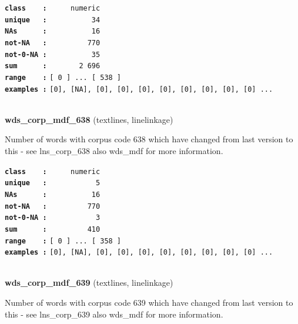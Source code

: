 \documentclass[]{article}
\begin{document}
\textbf{\texttt{class\ \ \ \ :}} \texttt{~~~~~numeric}\\
\textbf{\texttt{unique\ \ \ :}} \texttt{~~~~~~~~~~34}\\
\textbf{\texttt{NAs\ \ \ \ \ \ :}} \texttt{~~~~~~~~~~16}\\
\textbf{\texttt{not-NA\ \ \ :}} \texttt{~~~~~~~~~770}\\
\textbf{\texttt{not-0-NA\ :}} \texttt{~~~~~~~~~~35}\\
\textbf{\texttt{sum\ \ \ \ \ \ :}} \texttt{~~~~~~~2~696}\\
\textbf{\texttt{range\ \ \ \ :}}
\texttt{{[}\ 0\ {]}\ ...\ {[}\ 538\ {]}}\\
\textbf{\texttt{examples\ :}}
\texttt{{[}0{]},\ {[}NA{]},\ {[}0{]},\ {[}0{]},\ {[}0{]},\ {[}0{]},\ {[}0{]},\ {[}0{]},\ {[}0{]},\ {[}0{]}\ ...}\\

~

\textbf{wds\_corp\_mdf\_638} (textlines, linelinkage)

Number of words with corpus code 638 which have changed from last
version to this - see lns\_corp\_638 also wds\_mdf for more information.

\textbf{\texttt{class\ \ \ \ :}} \texttt{~~~~~numeric}\\
\textbf{\texttt{unique\ \ \ :}} \texttt{~~~~~~~~~~~5}\\
\textbf{\texttt{NAs\ \ \ \ \ \ :}} \texttt{~~~~~~~~~~16}\\
\textbf{\texttt{not-NA\ \ \ :}} \texttt{~~~~~~~~~770}\\
\textbf{\texttt{not-0-NA\ :}} \texttt{~~~~~~~~~~~3}\\
\textbf{\texttt{sum\ \ \ \ \ \ :}} \texttt{~~~~~~~~~410}\\
\textbf{\texttt{range\ \ \ \ :}}
\texttt{{[}\ 0\ {]}\ ...\ {[}\ 358\ {]}}\\
\textbf{\texttt{examples\ :}}
\texttt{{[}0{]},\ {[}NA{]},\ {[}0{]},\ {[}0{]},\ {[}0{]},\ {[}0{]},\ {[}0{]},\ {[}0{]},\ {[}0{]},\ {[}0{]}\ ...}\\

~

\textbf{wds\_corp\_mdf\_639} (textlines, linelinkage)

Number of words with corpus code 639 which have changed from last
version to this - see lns\_corp\_639 also wds\_mdf for more information.
\end{document}

